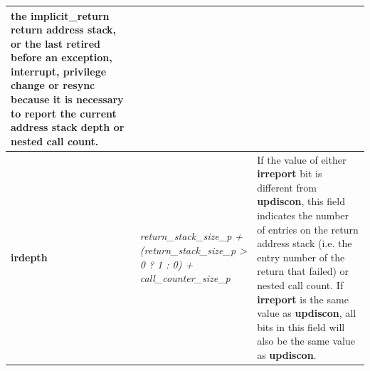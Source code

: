 \begin{table}[htp]
\begin{tabulary}{\textwidth}{|l|p{35mm}|p{90mm}|}
                the implicit\_return return address stack, or \newline
                the last retired before an exception, interrupt, privilege change or resync because it is necessary to report 
                the current address stack depth or nested call count. \\
    \hline
    \textbf{irdepth}	& \textit {return\_stack\_size\_p + (return\_stack\_size\_p > 0 ? 1 : 0) + call\_counter\_size\_p} & 
                If the value of either \textbf{irreport} bit is different from \textbf{updiscon}, this field 
				indicates the number of entries on the return address stack (i.e. the entry number of the return that
                failed) or nested call count.  If \textbf{irreport} is the same value as \textbf{updiscon}, 
                all bits in this field  will also be the same value as \textbf{updiscon}. \\
    \hline
  \end{tabulary}
\end{table}


